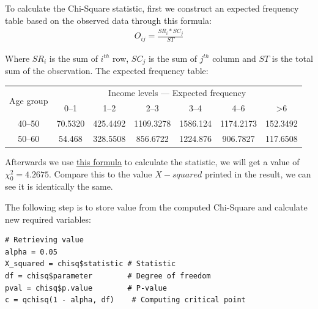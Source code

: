 \documentclass[a4paper]{article}
\numberwithin{equation}{section}
\begin{document}
To calculate the Chi-Square statistic, first we construct an expected frequency table based on the observed data through this formula:
\begin{align*}
  O_{ij} = \frac{SR_i * SC_j}{ST}
\end{align*}

Where \(SR_i\) is the sum of \(i^{th}\) row, \(SC_j\) is the sum of \(j^{th}\) column and \(ST\) is the total sum of the observation. The expected frequency table:
\begin{center}
  \begin{tabular}{ccccccc}
    \toprule
    \multirow{2}{*}{Age group} & \multicolumn{6}{c}{Income levels --- Expected frequency}                                                          \\
    \cmidrule(lr){2-7}
                               & 0--1                                                     & 1--2     & 2--3      & 3--4     & 4--6      & >6       \\
    \midrule
    40--50                     & 70.5320                                                  & 425.4492 & 1109.3278 & 1586.124 & 1174.2173 & 152.3492 \\
    50--60                     & 54.468                                                   & 328.5508 & 856.6722  & 1224.876 & 906.7827  & 117.6508 \\
    \bottomrule
  \end{tabular}
\end{center}

Afterwards we use \hyperref[chi:stat]{\underline{this formula}} to calculate the statistic, we will get a value of \( \chi_0^2 = 4.2675\). Compare this to the value \( X-squared \) printed in the result, we can see it is identically the same.

The following step is to store value from the computed Chi-Square and calculate new required variables:
\begin{mdframed}[leftline=false,rightline=false,backgroundcolor=magenta!10,nobreak=true]
  \begin{verbatim}
# Retrieving value
alpha = 0.05
X_squared = chisq$statistic # Statistic
df = chisq$parameter        # Degree of freedom
pval = chisq$p.value        # P-value
c = qchisq(1 - alpha, df)    # Computing critical point
  \end{verbatim}
\end{mdframed}
\end{document}
